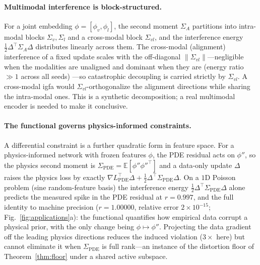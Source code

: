\documentclass[10pt,a4paper]{article}
\theoremstyle{plain}
\theoremstyle{definition}
\newcommand{\Sig}{\Sigma}
\newcommand{\Del}{\Delta}
\newcommand{\IGFA}{igfa}
\begin{document}
\paragraph{Multimodal interference is block-structured.} For a joint embedding
$\phi=[\phi_v,\phi_l]$, the second moment $\Sig_A$ partitions into intra-modal blocks
$\Sig_v,\Sig_l$ and a cross-modal block $\Sig_{vl}$, and the interference energy
$\tfrac12\Del^\top\Sig_A\Del$ distributes linearly across them. The cross-modal (alignment)
interference of a fixed update scales with the off-diagonal $\|\Sig_{vl}\|$---negligible when
the modalities are unaligned and dominant when they are (energy ratio $\gg1$ across all seeds)
---so catastrophic decoupling is carried strictly by $\Sig_{vl}$. A cross-modal \IGFA{} would
$\Sig_{vl}$-orthogonalize the alignment directions while sharing the intra-modal ones. This is a
synthetic decomposition; a real multimodal encoder is needed to make it conclusive.

\paragraph{The functional governs physics-informed constraints.} A differential constraint is
a further quadratic form in feature space. For a physics-informed network with frozen features
$\phi$, the PDE residual acts on $\phi''$, so the physics second moment is
$\Sig_{\mathrm{PDE}}=\mathbb E[\phi''\phi''^\top]$ and a data-only update $\Del$ raises the
physics loss by exactly $\nabla L_{\mathrm{PDE}}^\top\Del+\tfrac12\Del^\top\Sig_{\mathrm{PDE}}\Del$.
On a $1$D Poisson problem (sine random-feature basis) the interference energy
$\tfrac12\Del^\top\Sig_{\mathrm{PDE}}\Del$ alone predicts the measured spike in the PDE residual
at $r=0.997$, and the full identity to machine precision ($r=1.00000$, relative error
$2\times10^{-15}$; Fig.~\ref{fig:applications}a): the functional quantifies how empirical data
corrupt a physical prior, with the only change being $\phi\mapsto\phi''$. Projecting the data gradient off the leading
physics directions reduces the induced violation ($3\times$ here) but cannot eliminate it when
$\Sig_{\mathrm{PDE}}$ is full rank---an instance of the distortion floor of
Theorem~\ref{thm:floor} under a shared active subspace.
\end{document}

